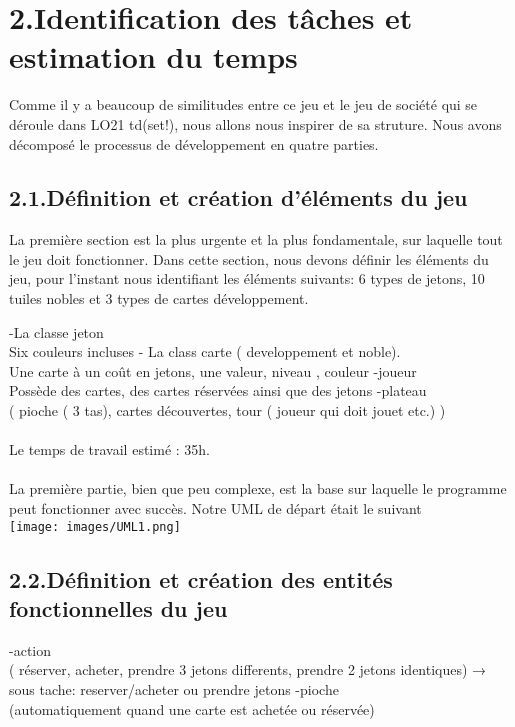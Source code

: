 \documentclass[a4paper]{article}
\begin{document}
\section*{2.Identification des tâches et estimation du temps}
Comme il y a beaucoup de similitudes entre ce jeu et le jeu de société qui se déroule dans LO21 td(set!), nous allons nous inspirer de sa struture.
Nous avons décomposé le processus de développement en quatre parties.\\

\subsection*{2.1.Définition et création d'éléments du jeu}
La première section est la plus urgente et la plus fondamentale, sur laquelle tout le jeu doit fonctionner. Dans cette section, nous devons définir les éléments du jeu, pour l'instant nous identifiant les éléments suivants: 6 types de jetons, 10 tuiles nobles et 3 types de cartes développement.

-La classe jeton\\
    Six couleurs incluses
- La class carte ( developpement et noble).\\
    Une carte à un coût en jetons, une valeur, niveau , couleur 
-joueur\\
Possède des cartes, des cartes réservées ainsi que des jetons
-plateau \\
( pioche ( 3 tas), cartes découvertes, tour ( joueur qui doit jouet etc.) )\\
\\
Le temps de travail estimé :  35h.\\
\\
La première partie, bien que peu complexe, est la base sur laquelle le programme peut fonctionner avec succès.
Notre UML de départ était le suivant\\
\texttt{[image: images/UML1.png]}

\subsection*{2.2.Définition et création des entités fonctionnelles du jeu}
-action \\
( réserver, acheter, prendre 3 jetons differents, prendre 2 jetons identiques)
    → sous tache: reserver/acheter ou prendre jetons
-pioche \\
(automatiquement quand une carte est achetée ou réservée)
\end{document}
